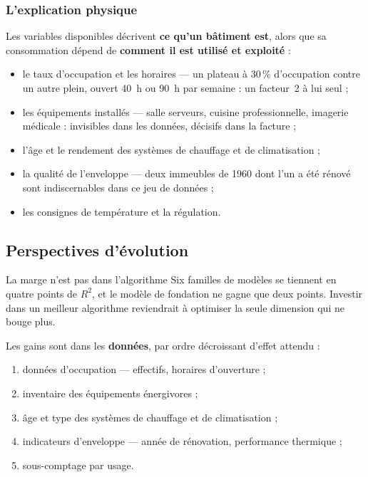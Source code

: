 \subsubsection*{L'explication physique}

Les variables disponibles décrivent \textbf{ce qu'un bâtiment est}, alors que sa
consommation dépend de \textbf{comment il est utilisé et exploité} :

\begin{itemize}[leftmargin=1.4em,itemsep=0.2em]
  \item le taux d'occupation et les horaires — un plateau à 30\,\% d'occupation
        contre un autre plein, ouvert 40~h ou 90~h par semaine : un facteur~2 à
        lui seul ;
  \item les équipements installés — salle serveurs, cuisine professionnelle,
        imagerie médicale : invisibles dans les données, décisifs dans la facture ;
  \item l'âge et le rendement des systèmes de chauffage et de climatisation ;
  \item la qualité de l'enveloppe — deux immeubles de 1960 dont l'un a été rénové
        sont indiscernables dans ce jeu de données ;
  \item les consignes de température et la régulation.
\end{itemize}

\subsection{Perspectives d'évolution}

\begin{constat}{La marge n'est pas dans l'algorithme}
Six familles de modèles se tiennent en quatre points de $R^2$, et le modèle de
fondation ne gagne que deux points. Investir dans un meilleur algorithme
reviendrait à optimiser la seule dimension qui ne bouge plus.
\end{constat}

Les gains sont dans les \textbf{données}, par ordre décroissant d'effet attendu :

\begin{enumerate}[leftmargin=1.6em,itemsep=0.2em]
  \item données d'occupation — effectifs, horaires d'ouverture ;
  \item inventaire des équipements énergivores ;
  \item âge et type des systèmes de chauffage et de climatisation ;
  \item indicateurs d'enveloppe — année de rénovation, performance thermique ;
  \item sous-comptage par usage.
\end{enumerate}


